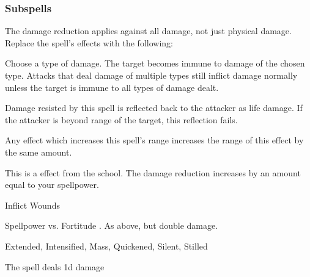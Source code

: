 \subsubsection{Subspells}
The damage reduction applies against all damage, not just physical damage.
Replace the spell's effects with the following:
\begin{spellcontent}
\begin{augmenteffects}
\spelleffect
Choose a type of damage.
The target becomes immune to damage of the chosen type.
Attacks that deal damage of multiple types still inflict damage normally unless the target is immune to all types of damage dealt.
\end{augmenteffects}
\end{spellcontent}
Damage resisted by this spell is reflected back to the attacker as life damage.
If the attacker is beyond \rngclose range of the target, this reflection fails.
\par Any effect which increases this spell's range increases the range of this effect by the same amount.
\par
This is a  effect from the  school.
The damage reduction increases by an amount equal to your spellpower.
\begin{spellsection}{Inflict Wounds}
\begin{spellcontent}
\begin{spelltargetinginfo}
\end{spelltargetinginfo}
\begin{spelleffects}
\begin{spellattack}{Spellpower vs. Fortitude}
\spellsuccess {}.
\spellcritical As above, but double damage.
\end{spellattack}
\end{spelleffects}
\end{spellcontent}
\begin{spellfooter}
 Extended, Intensified, Mass, Quickened, Silent, Stilled
\end{spellfooter}
\begin{spellsubcontent}
\begin{spellcantrip}
The spell deals \minus1d damage
\end{spellcantrip}
\end{spellsubcontent}
\end{spellsection}
